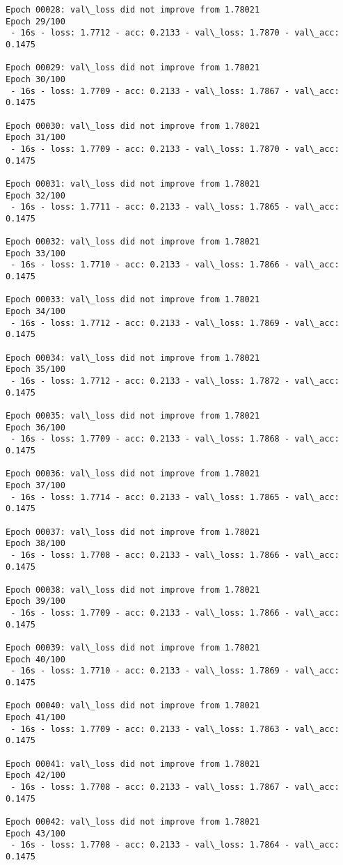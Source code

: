 \documentclass[11pt]{article}
\begin{document}
\begin{Verbatim}[commandchars=\\\{\}]
Epoch 00028: val\_loss did not improve from 1.78021
Epoch 29/100
 - 16s - loss: 1.7712 - acc: 0.2133 - val\_loss: 1.7870 - val\_acc: 0.1475

Epoch 00029: val\_loss did not improve from 1.78021
Epoch 30/100
 - 16s - loss: 1.7709 - acc: 0.2133 - val\_loss: 1.7867 - val\_acc: 0.1475

Epoch 00030: val\_loss did not improve from 1.78021
Epoch 31/100
 - 16s - loss: 1.7709 - acc: 0.2133 - val\_loss: 1.7870 - val\_acc: 0.1475

Epoch 00031: val\_loss did not improve from 1.78021
Epoch 32/100
 - 16s - loss: 1.7711 - acc: 0.2133 - val\_loss: 1.7865 - val\_acc: 0.1475

Epoch 00032: val\_loss did not improve from 1.78021
Epoch 33/100
 - 16s - loss: 1.7710 - acc: 0.2133 - val\_loss: 1.7866 - val\_acc: 0.1475

Epoch 00033: val\_loss did not improve from 1.78021
Epoch 34/100
 - 16s - loss: 1.7712 - acc: 0.2133 - val\_loss: 1.7869 - val\_acc: 0.1475

Epoch 00034: val\_loss did not improve from 1.78021
Epoch 35/100
 - 16s - loss: 1.7712 - acc: 0.2133 - val\_loss: 1.7872 - val\_acc: 0.1475

Epoch 00035: val\_loss did not improve from 1.78021
Epoch 36/100
 - 16s - loss: 1.7709 - acc: 0.2133 - val\_loss: 1.7868 - val\_acc: 0.1475

Epoch 00036: val\_loss did not improve from 1.78021
Epoch 37/100
 - 16s - loss: 1.7714 - acc: 0.2133 - val\_loss: 1.7865 - val\_acc: 0.1475

Epoch 00037: val\_loss did not improve from 1.78021
Epoch 38/100
 - 16s - loss: 1.7708 - acc: 0.2133 - val\_loss: 1.7866 - val\_acc: 0.1475

Epoch 00038: val\_loss did not improve from 1.78021
Epoch 39/100
 - 16s - loss: 1.7709 - acc: 0.2133 - val\_loss: 1.7866 - val\_acc: 0.1475

Epoch 00039: val\_loss did not improve from 1.78021
Epoch 40/100
 - 16s - loss: 1.7710 - acc: 0.2133 - val\_loss: 1.7869 - val\_acc: 0.1475

Epoch 00040: val\_loss did not improve from 1.78021
Epoch 41/100
 - 16s - loss: 1.7709 - acc: 0.2133 - val\_loss: 1.7863 - val\_acc: 0.1475

Epoch 00041: val\_loss did not improve from 1.78021
Epoch 42/100
 - 16s - loss: 1.7708 - acc: 0.2133 - val\_loss: 1.7867 - val\_acc: 0.1475

Epoch 00042: val\_loss did not improve from 1.78021
Epoch 43/100
 - 16s - loss: 1.7708 - acc: 0.2133 - val\_loss: 1.7864 - val\_acc: 0.1475


\end{Verbatim}
\end{document}
